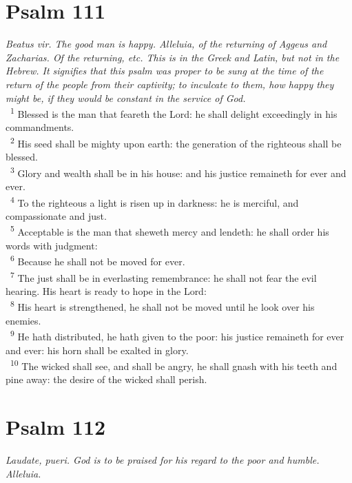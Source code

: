 \documentclass[a5paper,12pt]{article}
\begin{document}
\begin{multicols*}{2}
\section{Psalm 111}
\label{sec:orgd4f2cd0}
\emph{Beatus vir. The good man is happy. Alleluia, of the returning of Aggeus and Zacharias. Of the returning, etc. This is in the Greek and Latin, but not in the Hebrew. It signifies that this psalm was proper to be sung at the time of the return of the people from their captivity; to inculcate to them, how happy they might be, if they would be constant in the service of God.}\\

~\textsuperscript{1} Blessed is the man that feareth the Lord: he shall delight exceedingly in his commandments.\\
~\textsuperscript{2} His seed shall be mighty upon earth: the generation of the righteous shall be blessed.\\
~\textsuperscript{3} Glory and wealth shall be in his house: and his justice remaineth for ever and ever.\\
~\textsuperscript{4} To the righteous a light is risen up in darkness: he is merciful, and compassionate and just.\\
~\textsuperscript{5} Acceptable is the man that sheweth mercy and lendeth: he shall order his words with judgment:\\
~\textsuperscript{6} Because he shall not be moved for ever.\\
~\textsuperscript{7} The just shall be in everlasting remembrance: he shall not fear the evil hearing. His heart is ready to hope in the Lord:\\
~\textsuperscript{8} His heart is strengthened, he shall not be moved until he look over his enemies.\\
~\textsuperscript{9} He hath distributed, he hath given to the poor: his justice remaineth for ever and ever: his horn shall be exalted in glory.\\
~\textsuperscript{10} The wicked shall see, and shall be angry, he shall gnash with his teeth and pine away: the desire of the wicked shall perish.\\

\section{Psalm 112}
\label{sec:orge6e1e3a}
\emph{Laudate, pueri. God is to be praised for his regard to the poor and humble. Alleluia.}\\


\end{multicols*}
\end{document}
